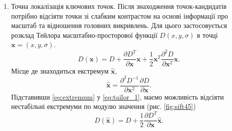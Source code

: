\begin{enumerate}
    \item Точна локалізація ключових точок. Після знаходження точок-кандидатів потрібно
          відсіяти точки зі слабким контрастом на основі
          інформації про масштаб та відношення головних викривлень. Для цього застосовується розклад
          Тейлора масштабно-просторової функції $D(x,y,\sigma)$ в точці $\boldsymbol{x} = (x,y,\sigma)$.
          \begin{equation}
              D(\boldsymbol{x}) = D + \frac{\partial D^T }{\partial \boldsymbol{x} }\boldsymbol{x} +
              \frac{1}{2}\boldsymbol{x}^T\frac{\partial^2 D}{\partial \boldsymbol{x}^2}\boldsymbol{x}.
              \label{eq:tailor_1}
          \end{equation}
          Місце де знаходиться екстремум $\widehat{\boldsymbol{x}}$,
          \begin{equation}
              \widehat{\boldsymbol{x}} = \frac{\partial^2 D^{-1} }{\partial
                  \boldsymbol{x}^2}\frac{\partial D }{\partial \boldsymbol{x}}.
              \label{eq:extremum}
          \end{equation}
          Підставивши \eqref{eq:extremum} у \eqref{eq:tailor_1}, маємо можливість відсіяти нестабільні
          екстремуми по модулю значення (рис. \eqref{fig:sift45})
          \begin{equation*}
              D(\widehat{\boldsymbol{x}}) = D + \frac{1}{2}\frac{\partial D^{T} }{\partial \boldsymbol{x}}\widehat{\boldsymbol{x}}.
          \end{equation*}


\end{enumerate}
